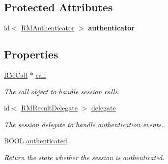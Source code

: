 \subsection*{Protected Attributes}
\begin{DoxyCompactItemize}
\item 
\hypertarget{interface_r_m_session_a759f830479707308f14b1405f6968379}{
id$<$ \hyperlink{protocol_r_m_authenticator-p}{RMAuthenticator} $>$ {\bfseries authenticator}}
\label{interface_r_m_session_a759f830479707308f14b1405f6968379}

\end{DoxyCompactItemize}
\subsection*{Properties}
\begin{DoxyCompactItemize}
\item 
\hypertarget{interface_r_m_session_a1eb4cd25fd5ff4adb90fd2025b2bd3ee}{
\hyperlink{interface_r_m_call}{RMCall} $\ast$ \hyperlink{interface_r_m_session_a1eb4cd25fd5ff4adb90fd2025b2bd3ee}{call}}
\label{interface_r_m_session_a1eb4cd25fd5ff4adb90fd2025b2bd3ee}

\begin{DoxyCompactList}\small\item\em The call object to handle session calls. \item\end{DoxyCompactList}\item 
\hypertarget{interface_r_m_session_a9f50b3e61cc57115a00bddcecf64f793}{
id$<$ \hyperlink{protocol_r_m_result_delegate-p}{RMResultDelegate} $>$ \hyperlink{interface_r_m_session_a9f50b3e61cc57115a00bddcecf64f793}{delegate}}
\label{interface_r_m_session_a9f50b3e61cc57115a00bddcecf64f793}

\begin{DoxyCompactList}\small\item\em The session delegate to handle authentication events. \item\end{DoxyCompactList}\item 
BOOL \hyperlink{interface_r_m_session_a71acbe4da4033e724b01e44d39ea2f24}{authenticated}
\begin{DoxyCompactList}\small\item\em Return the state whether the session is authenticated. \item\end{DoxyCompactList}\end{DoxyCompactItemize}


